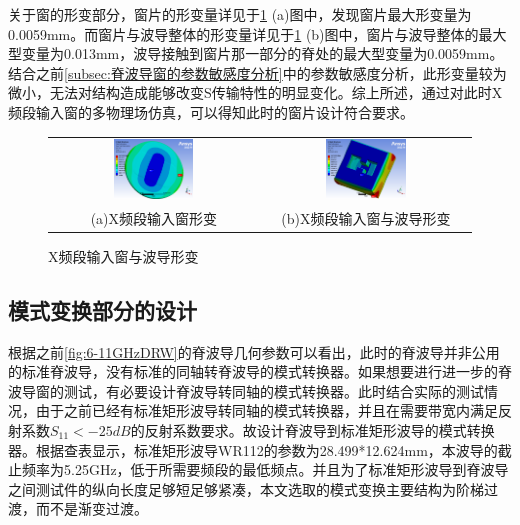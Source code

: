 \documentclass[master]{thesis-uestc}
\begin{document}
关于窗的形变部分，窗片的形变量详见于\ref{fig:X输入窗与波导形变} (a)图中，发现窗片最大形变量为0.0059mm。而窗片与波导整体的形变量详见于\ref{fig:X输入窗与波导形变} (b)图中，窗片与波导整体的最大型变量为0.013mm，波导接触到窗片那一部分的脊处的最大型变量为0.0059mm。结合之前\ref{subsec:脊波导窗的参数敏感度分析}中的参数敏感度分析，此形变量较为微小，无法对结构造成能够改变S传输特性的明显变化。综上所述，通过对此时X频段输入窗的多物理场仿真，可以得知此时的窗片设计符合要求。
\begin{figure}[!htb]
    \small
    \centering
    \begin{tabular}{@{\ }c@{\ }c}
        \includegraphics[width=0.4\textwidth]{pic/chapter3/X输入窗总形变.png} & 
        \hspace{5pt}
        \includegraphics[width=0.4\textwidth]{pic/chapter3/X输入窗与波导.png}     \\
        \mbox{\small (a)X频段输入窗形变}                                                                               & 
        \mbox{\small (b)X频段输入窗与波导形变}                                                                                  \\
    \end{tabular}
    \caption{X频段输入窗与波导形变}
    \label{fig:X输入窗与波导形变}
\end{figure}
        
\subsection{模式变换部分的设计}
根据之前\ref{fig:6-11GHzDRW}的脊波导几何参数可以看出，此时的脊波导并非公用的标准脊波导，没有标准的同轴转脊波导的模式转换器。如果想要进行进一步的脊波导窗的测试，有必要设计脊波导转同轴的模式转换器。此时结合实际的测试情况，由于之前已经有标准矩形波导转同轴的模式转换器，并且在需要带宽内满足反射系数$S_{11}<-25dB$的反射系数要求。故设计脊波导到标准矩形波导的模式转换器。根据查表显示，标准矩形波导WR112的参数为28.499*12.624mm，本波导的截止频率为5.25GHz，低于所需要频段的最低频点。并且为了标准矩形波导到脊波导之间测试件的纵向长度足够短足够紧凑，本文选取的模式变换主要结构为阶梯过渡，而不是渐变过渡。
\end{document}
